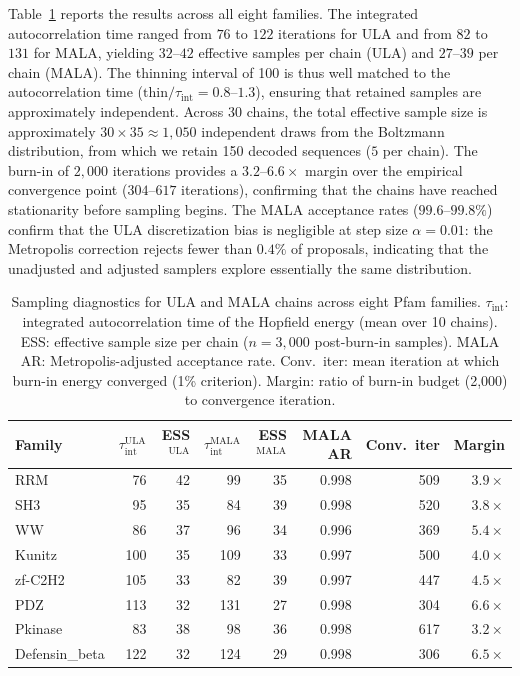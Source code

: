 Table~\ref{tab:sampling-diag} reports the results across all eight families. The integrated autocorrelation time ranged from $76$ to $122$ iterations for ULA and from $82$ to $131$ for MALA, yielding $32$--$42$ effective samples per chain (ULA) and $27$--$39$ per chain (MALA). The thinning interval of 100 is thus well matched to the autocorrelation time ($\mathrm{thin}/\tau_{\mathrm{int}} = 0.8$--$1.3$), ensuring that retained samples are approximately independent. Across 30 chains, the total effective sample size is approximately $30 \times 35 \approx 1{,}050$ independent draws from the Boltzmann distribution, from which we retain 150 decoded sequences ($5$ per chain). The burn-in of $2{,}000$ iterations provides a $3.2$--$6.6\times$ margin over the empirical convergence point ($304$--$617$ iterations), confirming that the chains have reached stationarity before sampling begins. The MALA acceptance rates ($99.6$--$99.8\%$) confirm that the ULA discretization bias is negligible at step size $\alpha{=}0.01$: the Metropolis correction rejects fewer than $0.4\%$ of proposals, indicating that the unadjusted and adjusted samplers explore essentially the same distribution.

\begin{table}[ht]
\centering
\caption{Sampling diagnostics for ULA and MALA chains across eight Pfam families. $\tau_{\mathrm{int}}$: integrated autocorrelation time of the Hopfield energy (mean over 10 chains). ESS: effective sample size per chain ($n{=}3{,}000$ post-burn-in samples). MALA AR: Metropolis-adjusted acceptance rate. Conv.\ iter: mean iteration at which burn-in energy converged (1\% criterion). Margin: ratio of burn-in budget (2{,}000) to convergence iteration.}
\label{tab:sampling-diag}
\small
\begin{tabular}{@{}lrrrrrrr@{}}
\toprule
Family & $\tau_{\mathrm{int}}^{\mathrm{ULA}}$ & ESS$^{\mathrm{ULA}}$ & $\tau_{\mathrm{int}}^{\mathrm{MALA}}$ & ESS$^{\mathrm{MALA}}$ & MALA AR & Conv.\ iter & Margin \\
\midrule
RRM            &  76 &  42 &  99 & 35 & 0.998 &  509 & $3.9\times$ \\
SH3            &  95 &  35 &  84 & 39 & 0.998 &  520 & $3.8\times$ \\
WW             &  86 &  37 &  96 & 34 & 0.996 &  369 & $5.4\times$ \\
Kunitz         & 100 &  35 & 109 & 33 & 0.997 &  500 & $4.0\times$ \\
zf-C2H2        & 105 &  33 &  82 & 39 & 0.997 &  447 & $4.5\times$ \\
PDZ            & 113 &  32 & 131 & 27 & 0.998 &  304 & $6.6\times$ \\
Pkinase        &  83 &  38 &  98 & 36 & 0.998 &  617 & $3.2\times$ \\
Defensin\_beta & 122 &  32 & 124 & 29 & 0.998 &  306 & $6.5\times$ \\
\bottomrule
\end{tabular}
\end{table}

